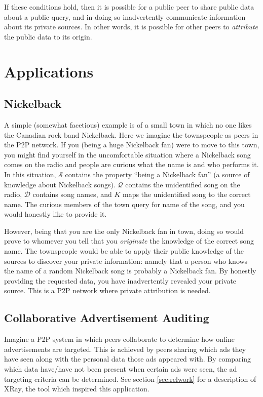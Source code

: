 \documentclass{article}
\newcommand{\secref}[1]{section \ref{sec:#1}}
\begin{document}
If these conditions hold, then it is possible for a public peer to share public
data about a public query, and in doing so inadvertently communicate information
about its private sources. In other words, it is possible for other peers to
{\it attribute} the public data to its origin.

\section{Applications}\label{sec:example}

\subsection{Nickelback}\label{sec:nickelback}

A simple (somewhat facetious) example is of a small town in which no one likes
the Canadian rock band Nickelback. Here we imagine the townspeople as peers in
the P2P network. If you (being a huge Nickelback fan) were to move to this town,
you might find yourself in the uncomfortable situation where a Nickelback song
comes on the radio and people are curious what the name is and who performs it.
In this situation, $\mathcal{S}$ contains the property ``being a Nickelback
fan'' (a source of knowledge about Nickelback songs). $\mathcal{Q}$ contains the
unidentified song on the radio, $\mathcal{D}$ contains song names, and $K$ maps
the unidentified song to the correct name. The curious members of the town query
for name of the song, and you would honestly like to provide it.

However, being that you are the only Nickelback fan in town, doing so would
prove to whomever you tell that you {\it originate} the knowledge of the correct
song name. The townspeople would be able to apply their public knowledge of the
sources to discover your private information: namely that a person who knows the
name of a random Nickelback song is probably a Nickelback fan. By honestly
providing the requested data, you have inadvertently revealed your private
source. This is a P2P network where private attribution is needed.

\subsection{Collaborative Advertisement Auditing}\label{sec:xray}

Imagine a P2P system in which peers collaborate to determine how online
advertisements are targeted. This is achieved by peers sharing which ads they
have seen along with the personal data those ads appeared with. By comparing
which data have/have not been present when certain ads were seen, the ad
targeting criteria can be determined. See \secref{relwork} for a description of
XRay, the tool which inspired this application.
\end{document}
